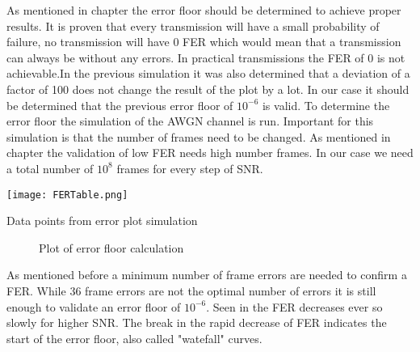 As mentioned in chapter  the error floor should be determined to achieve proper results.  It is proven that every transmission will have a small probability of failure, no transmission will have 0 \gls{FER} which would mean that a transmission can always be without any errors. In practical transmissions the \gls{FER} of 0 is not achievable.In the previous simulation it was also determined that a deviation of a factor of 100 does not change the result of the plot by a lot.
In our case it should be determined that the previous error floor of $10^{-6}$ is valid. 
\newline
To determine the error floor the simulation of the \gls{AWGN} channel is run. Important for this simulation is that the number of frames need to be changed. As mentioned in chapter  the validation of low \gls{FER} needs high number frames. In our case we need a total number of $10^{8}$ frames for every step of SNR.
\begin{table}[!htb]
	\centering
	\texttt{[image: FERTable.png]}
	\caption{Data points from error plot simulation}
	\label{fig:ErrorTable}
\end{table}
\begin{figure}[!htb]
	\setlength{}
	\setlength\fheight{0.4\textheight}
	\centering
	
	\caption{Plot of error floor calculation}
	\label{fig:ErrorFloor}
\end{figure}
As mentioned before a minimum number of frame errors are needed to confirm a \gls{FER}. While 36 frame errors are not the optimal number of errors it is still enough to validate an error floor of $10^{-6}$.
Seen in  the \gls{FER} decreases ever so slowly for higher \gls{SNR}. The break in the rapid decrease of \gls{FER} indicates the start of the error floor, also called "watefall" curves\cite{Richardson}. 
 






\clearpage
